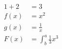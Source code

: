 \documentclass{article}
\begin{document}
	\begin{align*}
		1 + 2 &= 3\\
		f(x) &= x^2\\
		g(x) &= \frac{1}{x}\\
		F(x) &= \int^a_b\frac{1}{3}x^3
	\end{align*}
\end{document}
